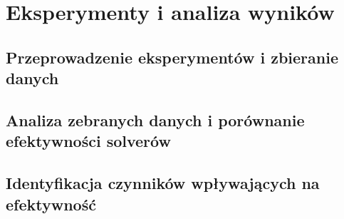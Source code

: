 \chapter{Eksperymenty i analiza wyników}

\section{Przeprowadzenie eksperymentów i zbieranie danych}

\section{Analiza zebranych danych i porównanie efektywności solverów}

\section{Identyfikacja czynników wpływających na efektywność}

